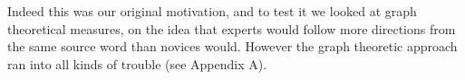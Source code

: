\documentclass{article}
\begin{document}
Indeed this was our original motivation, and to test it we looked at graph theoretical measures, on the idea that experts would follow more directions from the same source word than novices would. However the graph theoretic approach ran into all kinds of trouble (see Appendix A).







\end{document}
